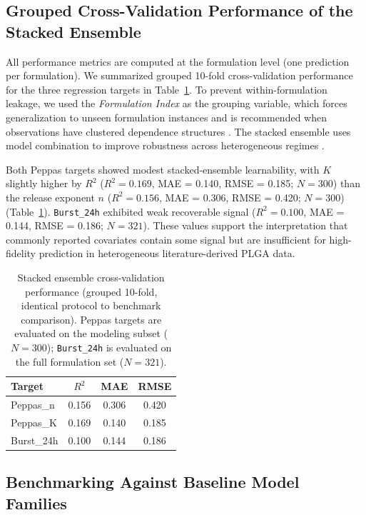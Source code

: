 \documentclass[preprint,12pt,authoryear]{elsarticle}
\begin{document}
\FloatBarrier

\subsection{Grouped Cross-Validation Performance of the Stacked Ensemble}

All performance metrics are computed at the formulation level (one prediction per formulation). We summarized grouped 10-fold cross-validation performance for the three regression targets in Table~\ref{tab:cv_performance}. To prevent within-formulation leakage, we used the \textit{Formulation Index} as the grouping variable, which forces generalization to unseen formulation instances and is recommended when observations have clustered dependence structures \citep{Roberts2017CVStructure}. The stacked ensemble uses model combination to improve robustness across heterogeneous regimes \citep{Wolpert1992Stacked}.

Both Peppas targets showed modest stacked-ensemble learnability, with $K$ slightly higher by $R^2$ ($R^2 = 0.169$, MAE = 0.140, RMSE = 0.185; $N=300$) than the release exponent $n$ ($R^2 = 0.156$, MAE = 0.306, RMSE = 0.420; $N=300$) (Table~\ref{tab:cv_performance}). \texttt{Burst\_24h} exhibited weak recoverable signal ($R^2 = 0.100$, MAE = 0.144, RMSE = 0.186; $N=321$). These values support the interpretation that commonly reported covariates contain some signal but are insufficient for high-fidelity prediction in heterogeneous literature-derived PLGA data.

\begin{table}[H]
\centering
\caption{Stacked ensemble cross-validation performance (grouped 10-fold, identical protocol to benchmark comparison). Peppas targets are evaluated on the modeling subset ($N=300$); \texttt{Burst\_24h} is evaluated on the full formulation set ($N=321$).}
\label{tab:cv_performance}
\begin{tabular}{lccc}
\toprule
Target & $R^2$ & MAE & RMSE \\
\midrule
Peppas\_n & 0.156 & 0.306 & 0.420 \\
Peppas\_K & 0.169 & 0.140 & 0.185 \\
Burst\_24h & 0.100 & 0.144 & 0.186 \\
\bottomrule
\end{tabular}
\end{table}

\FloatBarrier

\subsection{Benchmarking Against Baseline Model Families}
\end{document}
